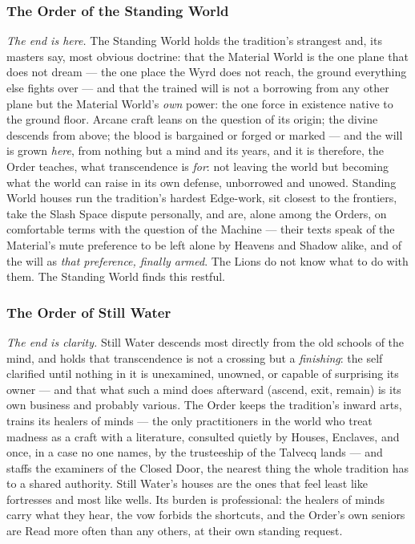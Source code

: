 \subsubsection{The Order of the Standing World}

\textit{The end is here.} The Standing World holds the tradition's strangest and, its masters say, most obvious doctrine: that the Material World is the one plane that does not dream --- the one place the Wyrd does not reach, the ground everything else fights over --- and that the trained will is not a borrowing from any other plane but the Material World's \textit{own} power: the one force in existence native to the ground floor. Arcane craft leans on the question of its origin; the divine descends from above; the blood is bargained or forged or marked --- and the will is grown \textit{here}, from nothing but a mind and its years, and it is therefore, the Order teaches, what transcendence is \textit{for}: not leaving the world but becoming what the world can raise in its own defense, unborrowed and unowed. Standing World houses run the tradition's hardest Edge-work, sit closest to the frontiers, take the Slash Space dispute personally, and are, alone among the Orders, on comfortable terms with the question of the Machine --- their texts speak of the Material's mute preference to be left alone by Heavens and Shadow alike, and of the will as \textit{that preference, finally armed}. The Lions do not know what to do with them. The Standing World finds this restful.

\subsubsection{The Order of Still Water}

\textit{The end is clarity.} Still Water descends most directly from the old schools of the mind, and holds that transcendence is not a crossing but a \textit{finishing}: the self clarified until nothing in it is unexamined, unowned, or capable of surprising its owner --- and that what such a mind does afterward (ascend, exit, remain) is its own business and probably various. The Order keeps the tradition's inward arts, trains its healers of minds --- the only practitioners in the world who treat madness as a craft with a literature, consulted quietly by Houses, Enclaves, and once, in a case no one names, by the trusteeship of the Talvecq lands --- and staffs the examiners of the Closed Door, the nearest thing the whole tradition has to a shared authority. Still Water's houses are the ones that feel least like fortresses and most like wells. Its burden is professional: the healers of minds carry what they hear, the vow forbids the shortcuts, and the Order's own seniors are Read more often than any others, at their own standing request.

